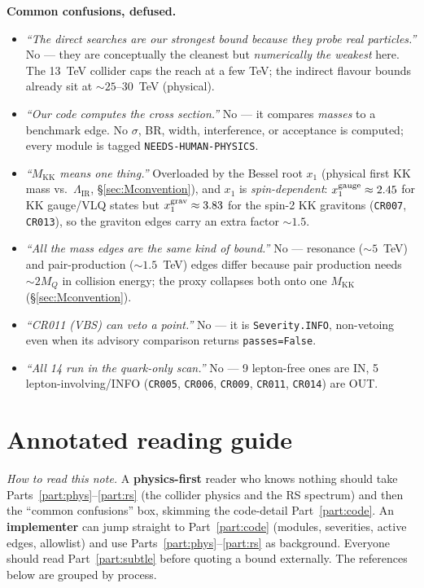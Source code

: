 \documentclass[11pt]{article}
\newenvironment{callout}[1]{%
  \par\medskip\begin{shaded}\noindent\textbf{#1}\par\smallskip}{\end{shaded}\medskip}
\newcommand{\MKK}{M_{\mathrm{KK}}}
\newcommand{\LIR}{\Lambda_{\mathrm{IR}}}
\newcommand{\code}[1]{\texttt{#1}}
\theoremstyle{definition}
\begin{document}
\begin{callout}{Common confusions, defused.}
\begin{itemize}[leftmargin=1.2em,nosep]
\item[\textbf{A.}] \emph{``The direct searches are our strongest bound because
they probe real particles.''} No --- they are conceptually the cleanest but
\emph{numerically the weakest} here. The 13~TeV collider caps the reach at a few
TeV; the indirect flavour bounds already sit at $\sim 25$--$30$~TeV (physical).
\item[\textbf{B.}] \emph{``Our code computes the cross section.''} No --- it
compares \emph{masses} to a benchmark edge. No $\sigma$, BR, width,
interference, or acceptance is computed; every module is tagged
\code{NEEDS-HUMAN-PHYSICS}.
\item[\textbf{C.}] \emph{``$\MKK$ means one thing.''} Overloaded by the Bessel
root $x_1$ (physical first KK mass vs.\ $\LIR$, \S\ref{sec:Mconvention}), and
$x_1$ is \emph{spin-dependent}: $x_1^{\rm gauge}\approx 2.45$ for KK gauge/VLQ
states but $x_1^{\rm grav}\approx 3.83$ for the spin-2 KK gravitons (\code{CR007},
\code{CR013}), so the graviton edges carry an extra factor $\sim 1.5$.
\item[\textbf{C$'$.}] \emph{``All the mass edges are the same kind of bound.''}
No --- resonance ($\sim 5$~TeV) and pair-production ($\sim 1.5$~TeV) edges differ
because pair production needs $\sim 2 M_Q$ in collision energy; the proxy
collapses both onto one $\MKK$ (\S\ref{sec:Mconvention}).
\item[\textbf{D.}] \emph{``CR011 (VBS) can veto a point.''} No --- it is
\code{Severity.INFO}, non-vetoing even when its advisory comparison returns
\code{passes=False}.
\item[\textbf{E.}] \emph{``All 14 run in the quark-only scan.''} No --- 9
lepton-free ones are IN, 5 lepton-involving/INFO (\code{CR005}, \code{CR006},
\code{CR009}, \code{CR011}, \code{CR014}) are OUT.
\end{itemize}
\end{callout}

\part*{Annotated reading guide}

\noindent\emph{How to read this note.} A \textbf{physics-first} reader who knows
nothing should take Parts~\ref{part:phys}--\ref{part:rs} (the collider physics
and the RS spectrum) and then the ``common confusions'' box, skimming the
code-detail Part~\ref{part:code}. An \textbf{implementer} can jump straight to
Part~\ref{part:code} (modules, severities, active edges, allowlist) and use
Parts~\ref{part:phys}--\ref{part:rs} as background. Everyone should read
Part~\ref{part:subtle} before quoting a bound externally. The references below
are grouped by process.
\end{document}
